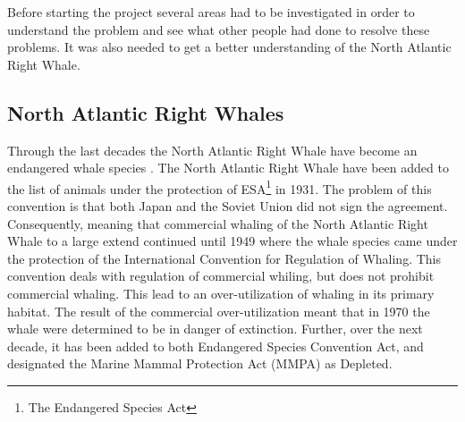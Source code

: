 Before starting the project several areas had to be investigated in order to understand the problem and see what other people had done to resolve these problems. It was also needed to get a better understanding of the North Atlantic Right Whale.

\subsection{North Atlantic Right Whales}
Through the last decades the North Atlantic Right Whale have become an endangered whale species \cite{NOAA}. The North Atlantic Right Whale have been added to the list of animals under the protection of ESA\footnote{The Endangered Species Act} in 1931. The problem of this convention is that both Japan and the Soviet Union did not sign the agreement. Consequently, meaning that commercial whaling of the North Atlantic Right Whale to a large extend continued until 1949 where the whale species came under the protection of the International Convention for Regulation of Whaling. 
This convention deals with regulation of commercial whiling, but does not prohibit commercial whaling. 
This lead to an over-utilization of whaling in its primary habitat. The result of the commercial over-utilization meant that in 1970 the whale were determined to be in danger of extinction. 
Further, over the next decade, it has been added to both Endangered Species Convention Act, and designated the Marine Mammal Protection Act (MMPA) as Depleted.

